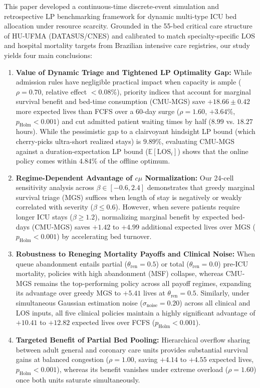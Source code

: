 \documentclass[final,5p,times,twocolumn]{elsarticle}
\begin{document}
This paper developed a continuous-time discrete-event simulation and retrospective LP benchmarking framework for dynamic multi-type ICU bed allocation under resource scarcity. Grounded in the 55-bed critical care structure of HU-UFMA (DATASUS/CNES) and calibrated to match specialty-specific LOS and hospital mortality targets from Brazilian intensive care registries, our study yields four main conclusions:
\begin{enumerate}[(1)]
    \item \textbf{Value of Dynamic Triage and Tightened LP Optimality Gap:} While admission rules have negligible practical impact when capacity is ample ($\rho = 0.70$, relative effect $< 0.08\%$), priority indices that account for marginal survival benefit and bed-time consumption (CMU-MGS) save $+18.66 \pm 0.42$ more expected lives than FCFS over a 60-day surge ($\rho = 1.60$, $+3.64\%$, $p_{\text{Holm}} < 0.001$) and cut admitted patient waiting times by half ($8.99$ vs. $18.27$ hours). While the pessimistic gap to a clairvoyant hindsight LP bound (which cherry-picks ultra-short realized stays) is $9.89\%$, evaluating CMU-MGS against a duration-expectation LP bound ($\mathbb{E}[\text{LOS}_i]$) shows that the online policy comes within $4.84\%$ of the offline optimum.
    \item \textbf{Regime-Dependent Advantage of $c\mu$ Normalization:} Our 24-cell sensitivity analysis across $\beta \in [-0.6, 2.4]$ demonstrates that greedy marginal survival triage (MGS) suffices when length of stay is negatively or weakly correlated with severity ($\beta \le 0.6$). However, when severe patients require longer ICU stays ($\beta \ge 1.2$), normalizing marginal benefit by expected bed-days (CMU-MGS) saves $+1.42$ to $+4.99$ additional expected lives over MGS ($p_{\text{Holm}} < 0.001$) by accelerating bed turnover.
    \item \textbf{Robustness to Reneging Mortality Payoffs and Clinical Noise:} When queue abandonment entails partial ($\theta_{\text{ren}} = 0.5$) or total ($\theta_{\text{ren}} = 0.0$) pre-ICU mortality, policies with high abandonment (MSF) collapse, whereas CMU-MGS remains the top-performing policy across all payoff regimes, expanding its advantage over greedy MGS to $+5.41$ lives at $\theta_{\text{ren}} = 0.5$. Similarly, under simultaneous Gaussian estimation noise ($\sigma_{\text{noise}} = 0.20$) across all clinical and LOS inputs, all five clinical policies maintain a highly significant advantage of $+10.41$ to $+12.82$ expected lives over FCFS ($p_{\text{Holm}} < 0.001$).
    \item \textbf{Targeted Benefit of Partial Bed Pooling:} Hierarchical overflow sharing between adult general and coronary care units provides substantial survival gains at balanced congestion ($\rho = 1.00$, saving $+4.14$ to $+4.55$ expected lives, $p_{\text{Holm}} < 0.001$), whereas its benefit vanishes under extreme overload ($\rho = 1.60$) once both units saturate simultaneously.
\end{enumerate}
\end{document}
